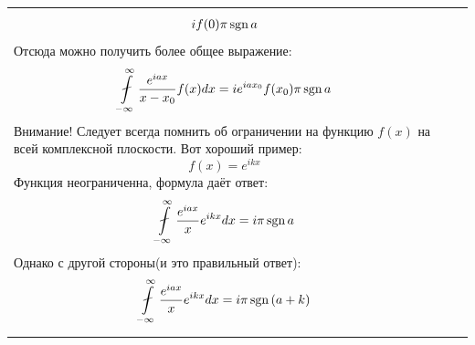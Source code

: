 \begin{center}
\begin{longtable}{|p{}|p{}|p{}|}
\[\begin{gathered}
	i f(0) \pi \mathrm{\,sgn}\, a
	\end{gathered}
	\]
	Отсюда можно получить более общее выражение:
	\[
	\begin{gathered}
	\fint\limits_{-\infty}^{\infty} \frac{e^{ia x}}{x - x_0} f(x) dx =
	i e^{iax_0} f(x_0) \pi \sign a
	\end{gathered}
	\]
	Внимание! Следует всегда помнить об ограничении на функцию $f(x)$ на всей комплексной плоскости. Вот хороший пример:
	\[
	f(x) = e^{ikx}
	\]
	Функция неограниченна, формула даёт ответ:
	\[
	\begin{gathered}
	\fint\limits_{-\infty}^{\infty} \frac{e^{ia x}}{x} e^{ikx} dx =
	i \pi \sign a
	\end{gathered}
	\]
	Однако с другой стороны(и это правильный ответ):
	\[
	\begin{gathered}
	\fint\limits_{-\infty}^{\infty} \frac{e^{ia x}}{x} e^{ikx} dx =
	i \pi \sign (a + k)
	\end{gathered}
	\]
	\\ 
\end{longtable}
\end{center}